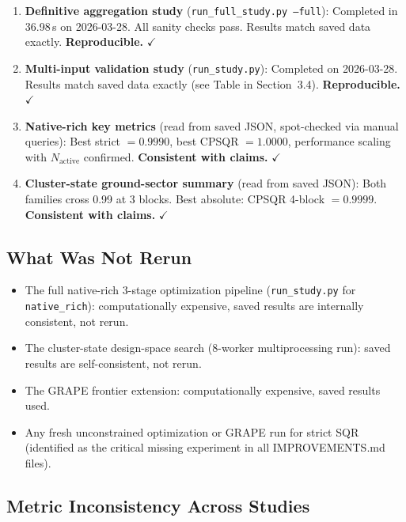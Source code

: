 \documentclass[11pt,letterpaper]{article}
\newcommand{\nact}{N_{\text{active}}}
\newcommand{\passmark}{\textcolor{pass}{$\checkmark$}}
\begin{document}
\begin{enumerate}
\item \textbf{Definitive aggregation study} (\texttt{run\_full\_study.py --full}):
  Completed in 36.98\,s on 2026-03-28.
  All sanity checks pass.  Results match saved data exactly.
  \textbf{Reproducible.} \passmark

\item \textbf{Multi-input validation study} (\texttt{run\_study.py}):
  Completed on 2026-03-28.
  Results match saved data exactly (see Table in Section~3.4).
  \textbf{Reproducible.} \passmark

\item \textbf{Native-rich key metrics} (read from saved JSON, spot-checked via manual queries):
  Best strict $= 0.9990$, best CPSQR $= 1.0000$, performance scaling with $\nact$ confirmed.
  \textbf{Consistent with claims.} \passmark

\item \textbf{Cluster-state ground-sector summary} (read from saved JSON):
  Both families cross 0.99 at 3 blocks.  Best absolute: CPSQR 4-block $= 0.9999$.
  \textbf{Consistent with claims.} \passmark
\end{enumerate}

\subsection{What Was Not Rerun}

\begin{itemize}
\item The full native-rich 3-stage optimization pipeline
  (\texttt{run\_study.py} for \texttt{native\_rich}): computationally expensive,
  saved results are internally consistent, not rerun.
\item The cluster-state design-space search (8-worker multiprocessing run):
  saved results are self-consistent, not rerun.
\item The GRAPE frontier extension: computationally expensive, saved results used.
\item Any fresh unconstrained optimization or GRAPE run for strict SQR
  (identified as the critical missing experiment in all IMPROVEMENTS.md files).
\end{itemize}

\subsection{Metric Inconsistency Across Studies}
\end{document}
